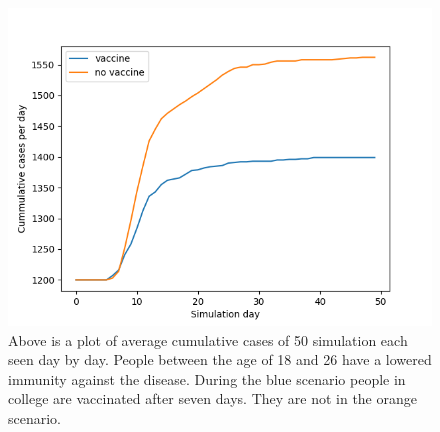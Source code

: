 \documentclass[runningheads]{llncs}
\begin{document}
	\begin{figure}[h!]
		\includegraphics[width=\textwidth]{student_vaccinations.png}
		\caption{Above is a plot of average cumulative cases of 50 simulation each seen day by day. People between the age of 18 and 26 have a lowered immunity against the disease. During the blue scenario people in college are vaccinated after seven days. They are not in the orange scenario.}
		\label{vax_campus}
	\end{figure}
	\clearpage
	
\end{document}
